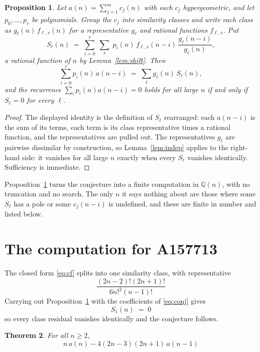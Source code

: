 \documentclass[11pt,a4paper]{article}
\theoremstyle{plain}
\newtheorem{theorem}{Theorem}
\newtheorem{proposition}[theorem]{Proposition}
\theoremstyle{definition}
\begin{document}
\begin{proposition}\label{prop:main}
Let $a(n)=\sum_{j=1}^{m}c_{j}(n)$ with each $c_{j}$ hypergeometric, and let
$p_{0},\dots,p_{r}$ be polynomials. Group the $c_{j}$ into similarity classes and write
each class as $g_{\ell}(n)\,f_{\ell,s}(n)$ for a representative $g_{\ell}$ and rational
functions $f_{\ell,s}$. Put
\[
S_{\ell}(n)\;=\;\sum_{i=0}^{r}\;\sum_{s}\;p_{i}(n)\,f_{\ell,s}(n-i)\,
\frac{g_{\ell}(n-i)}{g_{\ell}(n)} ,
\]
a rational function of $n$ by Lemma~\ref{lem:shift}. Then
\[
\sum_{i=0}^{r}p_{i}(n)\,a(n-i)\;=\;\sum_{\ell}g_{\ell}(n)\,S_{\ell}(n),
\]
and the recurrence $\sum_{i}p_{i}(n)a(n-i)=0$ holds for all large $n$ if and only if
$S_{\ell}=0$ for every $\ell$.
\end{proposition}

\begin{proof}
The displayed identity is the definition of $S_{\ell}$ rearranged: each $a(n-i)$ is the
sum of its terms, each term is its class representative times a rational function, and the
representatives are pulled out. The representatives $g_{\ell}$ are pairwise dissimilar by
construction, so Lemma~\ref{lem:indep} applies to the right-hand side: it vanishes for all
large $n$ exactly when every $S_{\ell}$ vanishes identically. Sufficiency is immediate.
\end{proof}

Proposition~\ref{prop:main} turns the conjecture into a finite computation in
$\mathbb{Q}(n)$, with no truncation and no search. The only $n$ it says nothing about are
those where some $S_{\ell}$ has a pole or some $c_{j}(n-i)$ is undefined, and these are
finite in number and listed below.

\section{The computation for A157713}

The closed form \eqref{eq:cf} splits into one similarity class, with
representative
\[
\frac{\left(2 n - 2\right)! \left(2 n + 1\right)!}{6 n!^{2} \left(n - 1\right)!}
\]
Carrying out Proposition~\ref{prop:main} with the coefficients of \eqref{eq:conj} gives
\[
S_{1}(n)\;=\;0
\]
so every class residual vanishes identically and the conjecture follows.

\begin{theorem}
For all $n\ge 2$,
\[
n\,a(n) -  4 \left(2 n - 3\right) \left(2 n + 1\right)\,a(n-1)
\]
\end{theorem}
\end{document}
